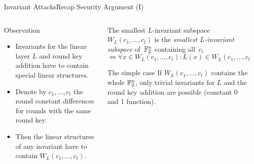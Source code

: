 \begin{frame}{Invariant Attacks}{Recap Security Argument (I)}
    \begin{columns}
        \begin{column}{0.35\textwidth}
        \begin{block}{Observation}
            \begin{itemize}
                \item Invariants for the linear layer $L$ and round key addition have to contain special linear structures.
                \item Denote by $c_1, \dots, c_t$ the round constant differences for rounds with the same round key.
                \item Then the linear structures of any invariant have to contain $W_L(c_1, \dots, c_t)$.
            \end{itemize}
        \end{block}
        \pause
    \end{column}
    \begin{column}{0.6\textwidth}
    \begin{block}{The smallest $L$-invariant subspace}
        $W_L(c_1, \dots, c_t)$ is the \emph{smallest $L$-invariant subspace} of~$\mathbb{F}_2^n$ containing all~$c_i$
        \begin{equation*}
            \Leftrightarrow \forall x \in W_L(c_1, \dots, c_t): L(x) \in W_L(c_1, \dots, c_t)
        \end{equation*}
    \end{block}
    \pause
    \begin{exampleblock}{The simple case}
        If $W_L(c_1, \dots, c_t)$ contains the whole $\mathbb{F}_2^n$, only trivial invariants for $L$ and the round key addition are possible (constant 0 and 1 function).
    \end{exampleblock}
    \end{column}
    \end{columns}
\end{frame}

